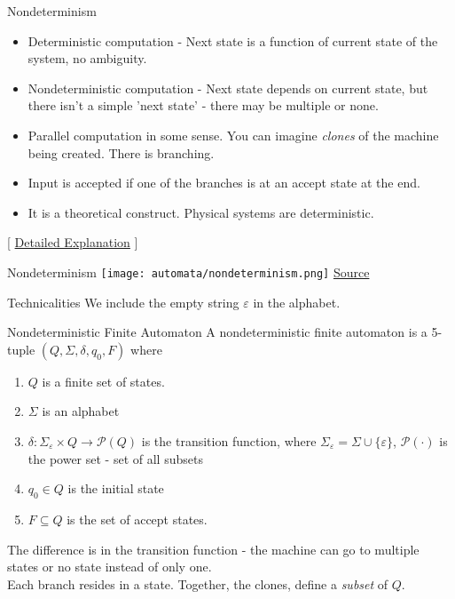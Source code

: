 \documentclass{beamer}
\begin{document}
\begin{frame}{Nondeterminism}
\pause
\begin{itemize}
    \item Deterministic computation - Next state is a function of current state of the system, no ambiguity.
    \pause
    \item Nondeterministic computation - Next state depends on current state, but there isn't a simple 'next state' - there may be multiple or none.
    \pause
    \item Parallel computation in some sense. You can imagine \emph{clones} of the machine being created. There is branching.
    \pause
    \item Input is accepted if one of the branches is at an accept state at the end.
    \pause
    \item It is a theoretical construct. Physical systems are deterministic.
\end{itemize}
    [ \href{https://www3.cs.stonybrook.edu/~cse350/slides/automata5.pdf}{Detailed Explanation} ]
\end{frame}
\begin{frame}{Nondeterminism}
\texttt{[image: automata/nondeterminism.png]}    
    \href{https://www3.cs.stonybrook.edu/~cse350/slides/automata5.pdf}{Source}
\end{frame}
\begin{frame}{Technicalities}
We include the empty string \( \varepsilon\) in the alphabet.
\begin{block}{Nondeterministic Finite Automaton}
A nondeterministic finite automaton is a 5-tuple \( (Q, \Sigma, \delta, q_0, F) \) where
    \begin{enumerate}
        \item \(Q\) is a finite set of states.
        \item \(\Sigma\) is an alphabet
        \item \(\delta: \Sigma_\varepsilon \times Q \rightarrow \mathcal{P}(Q)\) is the transition function, where \(\Sigma_\varepsilon = \Sigma \cup \{\varepsilon\}\), \(\mathcal{P}(\cdot)\) is the power set - set of all subsets
        \item \(q_0 \in Q\) is the initial state
        \item \( F \subseteq Q\) is the set of accept states.
    \end{enumerate}
    \end{block}
The difference is in the transition function - the machine can go to multiple states or no state instead of only one.\\
Each branch resides in a state. Together, the clones, define a \emph{subset} of \(Q\).
\end{frame}
\end{document}
